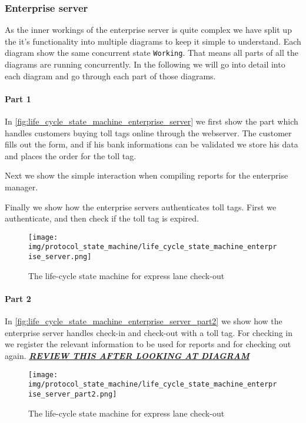 \subsubsection*{Enterprise server}
As the inner workings of the enterprise server is quite complex we have split up the it's functionality into multiple diagrams to keep it simple to understand. Each diagram show the same concurrent state \texttt{Working}. That means all parts of all the diagrams are running concurrently. In the following we will go into detail into each diagram and go through each part of those diagrams.

\paragraph*{Part 1} In \autoref{fig:life_cycle_state_machine_enterprise_server} we first show the part which handles customers buying toll tags online through the webserver. The customer fills out the form, and if his bank informations can be validated we store his data and places the order for the toll tag.

Next we show the simple interaction when compiling reports for the enterprise manager.

Finally we show how the enterprise servers authenticates toll tags. First we authenticate, and then check if the toll tag is expired.

\begin{figure}[H]
\centering
\texttt{[image: img/protocol\_state\_machine/life\_cycle\_state\_machine\_enterprise\_server.png]}
\caption{The life-cycle state machine for express lane check-out}
\label{fig:life_cycle_state_machine_enterprise_server}
\end{figure}

\paragraph*{Part 2} In \autoref{fig:life_cycle_state_machine_enterprise_server_part2} we show how the enterprise server handles check-in and check-out with a toll tag. For checking in we register the relevant information to be used for reports and for checking out again. \textit{\textbf{\underline{REVIEW THIS AFTER LOOKING AT DIAGRAM}}}

\begin{figure}[H]
\centering
\texttt{[image: img/protocol\_state\_machine/life\_cycle\_state\_machine\_enterprise\_server\_part2.png]}
\caption{The life-cycle state machine for express lane check-out}
\label{fig:life_cycle_state_machine_enterprise_server_part2}
\end{figure}

